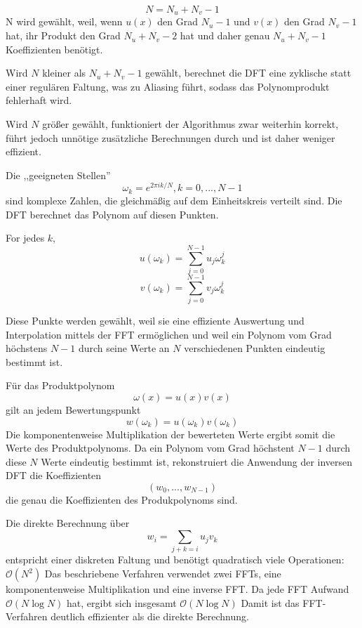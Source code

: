 \documentclass[12pt]{scrartcl}
\begin{document}
\begin{enumAlph}
    \item 
    \[N = N_u + N_v - 1\] 
    N wird gewählt, weil, wenn $u(x)$ den Grad $N_u - 1$ und $v(x)$ den Grad $N_v - 1$ hat, ihr Produkt den Grad $N_u + N_v - 2$ hat und daher genau $N_u + N_v - 1$ Koeffizienten benötigt.

    Wird $N$ kleiner als $N_u + N_v - 1$ gewählt, berechnet die DFT eine zyklische statt einer regulären Faltung, was zu Aliasing führt, sodass das Polynomprodukt fehlerhaft wird.

    Wird $N$ größer gewählt, funktioniert der Algorithmus zwar weiterhin korrekt, führt jedoch unnötige zusätzliche Berechnungen durch und ist daher weniger effizient.

    \item Die ,,geeigneten Stellen'' \\
    \[\omega_k = e^{2\pi i k / N}, k=0,...,N-1\]
    sind komplexe Zahlen, die gleichmäßig auf dem Einheitskreis verteilt sind. Die DFT berechnet das Polynom auf diesen Punkten.

    For jedes $k$,\\
    \[u(\omega_k) = \sum_{j=0}^{N-1} u_j\omega_k^j\]
    \[v(\omega_k) = \sum_{j=0}^{N-1} v_j\omega_k^j\]

    Diese Punkte werden gewählt, weil sie eine effiziente Auswertung und Interpolation mittels der FFT ermöglichen und weil ein Polynom vom Grad höchstens $N-1$ durch seine Werte an $N$ verschiedenen Punkten eindeutig bestimmt ist. 

    \item Für das Produktpolynom 
    \[ \omega(x) = u(x)v(x)\]
    gilt an jedem Bewertungspunkt
    \[w(\omega_k) = u(\omega_k)v(\omega_k) \]
    Die komponentenweise Multiplikation der bewerteten Werte ergibt somit die Werte des Produktpolynoms.
    Da ein Polynom vom Grad höchstent $N-1$ durch diese $N$ Werte eindeutig bestimmt ist, rekonstruiert die Anwendung der inversen DFT die Koeffizienten
    \[(w_0,...,w_{N-1})\]
    die genau die Koeffizienten des Produkpolynoms sind.

    \item Die direkte Berechnung über
    \[w_i = \sum_{j+k=i} u_j v_k\]
    entspricht einer diskreten Faltung und benötigt quadratisch viele Operationen:
    $\mathcal{O}(N^2)$
    Das beschriebene Verfahren verwendet zwei FFTs, eine komponentenweise Multiplikation und eine inverse FFT. Da jede FFT Aufwand
    $\mathcal{O}(N\log N)$
    hat, ergibt sich insgesamt
    $\mathcal{O}(N\log N)$
    Damit ist das FFT-Verfahren deutlich effizienter als die direkte Berechnung.
\end{enumAlph}
\end{document}
